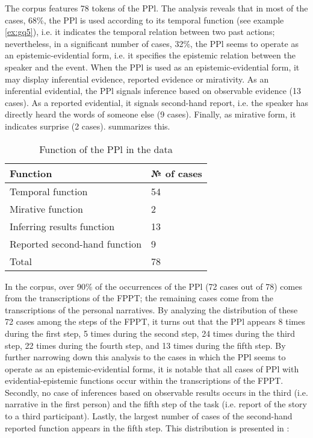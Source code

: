 \documentclass[output=paper]{langsci/langscibook}
\begin{document}
The corpus features 78 tokens of the PPl. The analysis reveals that in most of the cases, 68\%, the PPl is used according to its temporal function (see example \ref{ex:gq5}), i.e. it indicates the temporal relation between two past actions; nevertheless, in a significant number of cases, 32\%, the PPl seems to operate as an epistemic-evidential form, i.e. it specifies the epistemic relation between the speaker and the event. When the PPl is used as an epistemic-evidential form, it may display inferential evidence, reported evidence or mirativity. As an inferential evidential, the PPl signals inference based on observable evidence (13 cases). As a reported evidential, it signals second-hand report, i.e. the speaker has directly heard the words of someone else (9 cases). Finally, as mirative form, it indicates surprise (2 cases).  summarizes this.

\begin{table}
\centering
\begin{tabularx}{\textwidth}{ll}
\hline
\textbf{Function} & \textbf{№ of cases}\\
\hline
Temporal function & 54\\
Mirative function & 2\\
Inferring results function & 13\\
Reported second-hand function & 9\\
\hline
Total & 78\\
\hline
\end{tabularx}
\caption{Function of the PPl in the data}\label{tab:gq1} 
\end{table}

In the corpus, over 90\% of the occurrences of the PPl (72 cases out of 78) comes from the transcriptions of the FPPT; the remaining cases come from the transcriptions of the personal narratives. By analyzing the distribution of these 72 cases among the steps of the FPPT, it turns out that the PPl appears 8 times during the first step, 5 times during the second step, 24 times during the third step, 22 times during the fourth step, and 13 times during the fifth step. By further narrowing down this analysis to the cases in which the PPl seems to operate as an epistemic-evidential forms, it is notable that all cases of PPl with evidential-epistemic functions occur within the transcriptions of the FPPT. Secondly, no case of inferences based on observable results occurs in the third (i.e. narrative in the first person) and the fifth step of the task (i.e. report of the story to a third participant). Lastly, the largest number of cases of the second-hand reported function appears in the fifth step. This distribution is presented in : 
\end{document}
